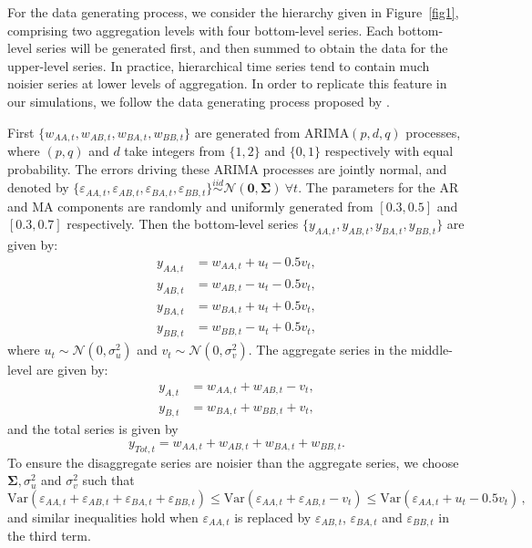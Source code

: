 \documentclass[12pt]{article}
\def\var{\text{Var}}
\theoremstyle{definition}
\begin{document}
For the data generating process, we consider the hierarchy given in Figure~\ref{fig1}, comprising two aggregation levels with four bottom-level series. Each bottom-level series will be generated first, and then summed to obtain the data for the upper-level series. In practice, hierarchical time series tend to contain much noisier series at lower levels of aggregation. In order to replicate this feature in our simulations, we follow the data generating process proposed by \citet{Wickramasuriya2017}.

First $\{w_{AA,t},w_{AB,t},w_{BA,t},w_{BB,t}\}$ are generated from ARIMA$(p,d,q)$ processes, where $(p,q)$ and $d$ take integers from $\{1,2\}$ and $\{0,1\}$ respectively with equal probability. The errors driving these ARIMA processes are jointly normal, and denoted by $\{\varepsilon_{AA,t},\varepsilon_{AB,t},\varepsilon_{BA,t},\varepsilon_{BB,t}\} \overset{iid}{\sim} \mathcal{N}(\bm{0}, \bm{\Sigma})~\forall t$. The parameters for the AR and MA components are randomly and uniformly generated from $[0.3,0.5]$ and $[0.3,0.7]$ respectively. Then the bottom-level series $\{y_{AA,t},y_{AB,t},y_{BA,t},y_{BB,t}\}$ are given by:
\begin{align*}
y_{AA,t} &= w_{AA,t} + u_t - 0.5v_t,\\
y_{AB,t} &= w_{AB,t} - u_t - 0.5v_t,\\
y_{BA,t} &= w_{BA,t} + u_t + 0.5v_t,\\
y_{BB,t} &= w_{BB,t} - u_t + 0.5v_t,
\end{align*}
where $u_t \sim \mathcal{N}(0,\sigma^2_u)$ and $v_t \sim \mathcal{N}(0,\sigma^2_v)$. The aggregate series in the middle-level are given by:
\begin{align*}
y_{A,t} &= w_{AA,t} + w_{AB,t} - v_t,\\
y_{B,t} &= w_{BA,t} + w_{BB,t} + v_t,
\end{align*}
and the total series is given by
\[
  y_{Tot,t} = w_{AA,t} + w_{AB,t} + w_{BA,t} + w_{BB,t}.
\]
To ensure the disaggregate series are noisier than the aggregate series, we choose $\bm{\Sigma}, \sigma^2_u$ and $\sigma^2_v$ such that
\[
  \var(\varepsilon_{AA,t} + \varepsilon_{AB,t} + \varepsilon_{BA,t} + \varepsilon_{BB,t})
  \le \var(\varepsilon_{AA,t}+\varepsilon_{AB,t}-v_t)
  \le \var(\varepsilon_{AA,t}+u_t-0.5v_t)\,,
\]
and similar inequalities hold when $\varepsilon_{AA,t}$ is replaced by $\varepsilon_{AB,t}$, $\varepsilon_{BA,t}$ and $\varepsilon_{BB,t}$ in the third term.
\end{document}

